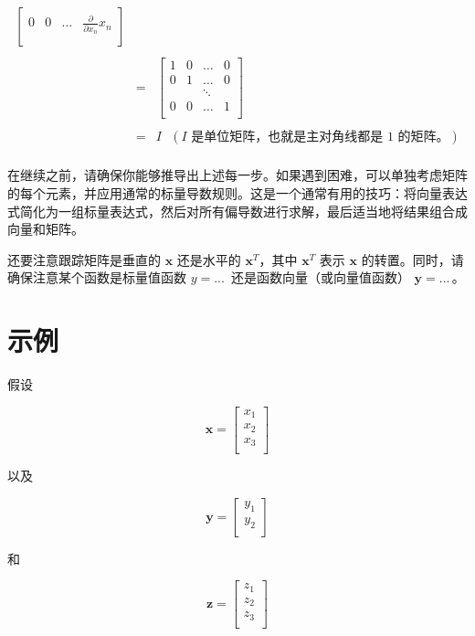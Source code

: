 \documentclass[lang=cn,newtx,10pt,scheme=chinese]{elegantbook}
\begin{document}
\begin{center}
\begin{eqnarray*}
\begin{bmatrix}
	0 & 0 &\ldots& \frac{\partial}{\partial {x_n}} x_n \\
	\end{bmatrix}\\\\
	 & = & \begin{bmatrix}
	1 & 0 & \ldots& 0 \\
	0 &1 &\ldots & 0 \\
	& & \ddots\\
	0 & 0 & \ldots &1 \\
	\end{bmatrix}\\\\
	& = & I ~~~(I \text{ 是单位矩阵，也就是主对角线都是 1 的矩阵。})\\
	\end{eqnarray*}

\end{center}

在继续之前，请确保你能够推导出上述每一步。如果遇到困难，可以单独考虑矩阵的每个元素，并应用通常的标量导数规则。这是一个通常有用的技巧：将向量表达式简化为一组标量表达式，然后对所有偏导数进行求解，最后适当地将结果组合成向量和矩阵。

还要注意跟踪矩阵是垂直的 $\mathbf{x}$ 还是水平的 $\mathbf{x}^T$，其中 $\mathbf{x}^T$ 表示 $\mathbf{x}$ 的转置。同时，请确保注意某个函数是标量值函数 $y = ...\,$ 还是函数向量（或向量值函数） $\mathbf{y} = ...\,$。

\section{示例}

假设

\[\mathbf{x} = \begin{bmatrix}
           x_1\\
           x_2\\
           x_3\\
           \end{bmatrix}\]

以及

\[\mathbf{y} = \begin{bmatrix}
           y_1\\
           y_2\\
           \end{bmatrix}\]

和

\[\mathbf{z} = \begin{bmatrix}
           z_1\\
           z_2\\
           z_3\\
           \end{bmatrix}\]
\end{document}
